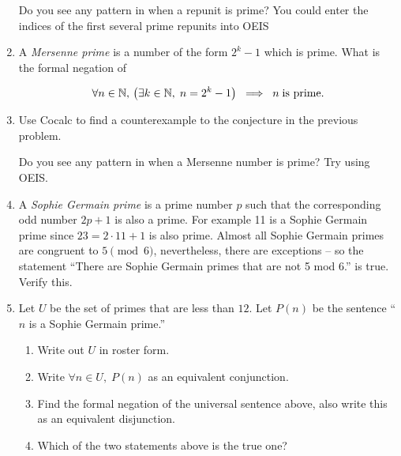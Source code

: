 \documentclass{amsart}
\begin{document}
\begin{enumerate}
\vspace{.1in}

Do you see any pattern in when a repunit is prime?  You could enter the indices of the first several prime repunits into OEIS\textellipsis

\vspace{.5in}



\item A {\em Mersenne prime} is a number of the form $2^k - 1$ which is prime.  What is the formal negation of 

\[ \forall n \in {\mathbb N}, \, \left( \exists k \in {\mathbb N}, \; n=2^k-1 \right) \; \implies \; n \; \mbox{is prime.} \]


\vspace{1in}

\item Use Cocalc to find a counterexample to the conjecture in the previous problem.

\vspace{.1in}

Do you see any pattern in when a Mersenne number is prime?  Try using OEIS.

\vspace{.5in}

\item A  \emph{Sophie Germain prime} is a prime number $p$
such that the corresponding odd number $2p+1$ is also a prime.  For example 11 is a 
Sophie Germain prime since $23 = 2\cdot 11 + 1$ is also prime.  Almost all Sophie Germain
primes are congruent to $5 \pmod{6}$, nevertheless, there are exceptions -- so the
statement ``There are Sophie Germain primes that are not 5 mod 6.'' is true.  Verify this.

\vfill

\item Let $U$ be the set of primes that are less than $12$.  Let $P(n)$ be the sentence ``$n$ is a Sophie Germain prime.''

\begin{enumerate}
\item Write out $U$ in roster form.

\vspace{.5in}

\item Write $\displaystyle \forall n \in U, \; P(n)$ as an equivalent conjunction.

\vspace{.5in}

\item Find the formal negation of the universal sentence above, also write this as an equivalent disjunction.

\vspace{.5 in}

\item Which of the two statements above is the true one?

\vspace{.5in}

\end{enumerate}

\end{enumerate}
\end{document}
